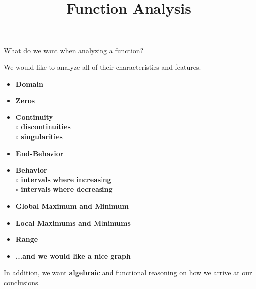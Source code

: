 \documentclass{ximera}
\title{Function Analysis}
\begin{document}
\begin{abstract}
%
\end{abstract}
\maketitle






What do we want when analyzing a function? 




We would like to analyze all of their characteristics and features. 



\begin{itemize}
     \item \textbf{\textcolor{red!70!black}{Domain}} 
     \item \textbf{\textcolor{red!70!black}{Zeros}} 
     \item \textbf{\textcolor{red!70!black}{Continuity}} \\
     \text{    }$\circ$ \textbf{\textcolor{purple!85!blue}{discontinuities}}\\
     \text{    }$\circ$ \textbf{\textcolor{purple!85!blue}{singularities}}\\
     \item \textbf{\textcolor{red!70!black}{End-Behavior}} 
     \item \textbf{\textcolor{red!70!black}{Behavior}} \\
     \text{    }$\circ$ \textbf{\textcolor{purple!85!blue}{intervals where increasing}}\\
     \text{    }$\circ$ \textbf{\textcolor{purple!85!blue}{intervals where decreasing}}\\
     \item \textbf{\textcolor{red!70!black}{Global Maximum and Minimum}} 
     \item \textbf{\textcolor{red!70!black}{Local Maximums and Minimums}} 
     \item \textbf{\textcolor{red!70!black}{Range}} 
     \item \textbf{\textcolor{blue!55!black}{...and we would like a nice graph}} 
\end{itemize}







In addition, we want \textbf{\textcolor{red!70!black}{algebraic}} and functional reasoning on how we arrive at our conclusions.
\end{document}
